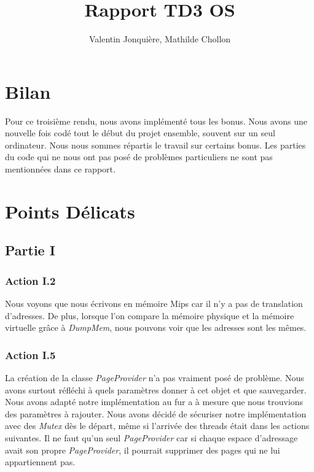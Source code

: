 \documentclass{article}
\author{
    Valentin Jonquière,
    Mathilde Chollon
}
\title{Rapport TD3 OS}
\begin{document}
\maketitle

\pagebreak

\tableofcontents

\pagebreak

\section{Bilan}

Pour ce troisième rendu, nous avons implémenté tous les bonus. Nous avons une nouvelle fois codé tout le début du projet ensemble,
souvent sur un seul ordinateur. Nous nous sommes répartis le travail sur certains bonus.
Les parties du code qui ne nous ont pas posé de problèmes particuliers ne sont pas mentionnées dans ce rapport.

\section{Points Délicats}
\subsection{Partie I}
\subsubsection{Action I.2}
Nous voyons que nous écrivons en mémoire Mips car il n'y a pas de translation d'adresses. De plus, lorsque 
l'on compare la mémoire physique et la mémoire virtuelle grâce à \textit{DumpMem}, nous pouvons voir que les adresses sont les mêmes.

\subsubsection{Action I.5}
La création de la classe \textit{PageProvider} n'a pas vraiment posé de problème. Nous avons
surtout réfléchi à quels paramètres donner à cet objet et que sauvegarder. Nous avons 
adapté notre implémentation au fur a à mesure que nous trouvions des paramètres à rajouter.
Nous avons décidé de sécuriser notre implémentation avec des \textit{Mutex} dès le départ,
même si l'arrivée des threads était dans les actions suivantes. Il ne faut qu'un seul \textit{PageProvider}
car si chaque espace d'adressage avait son propre \textit{PageProvider}, il pourrait supprimer des
pages qui ne lui appartiennent pas.
\end{document}
